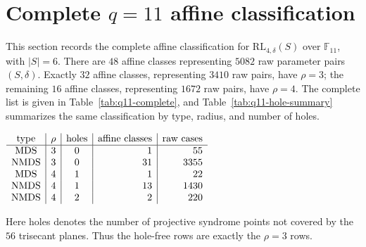 \documentclass[11pt]{article}
\newcommand{\F}{\mathbb F}
\newcommand{\RL}{\mathrm{RL}}
\theoremstyle{plain}
\theoremstyle{definition}
\begin{document}
\section{Complete \texorpdfstring{\(q=11\)}{q=11} affine classification}
\label{sec:q11-complete}

This section records the complete affine classification for
\(\RL_{4,\delta}(S)\) over \(\F_{11}\), with \(|S|=6\).  There are \(48\)
affine classes representing \(5082\) raw parameter pairs \((S,\delta)\).
Exactly \(32\) affine classes, representing \(3410\) raw pairs, have
\(\rho=3\); the remaining \(16\) affine classes, representing \(1672\) raw
pairs, have \(\rho=4\).  The complete list is given in
Table~\ref{tab:q11-complete}, and Table~\ref{tab:q11-hole-summary}
summarizes the same classification by type, radius, and number of holes.

\begin{center}
\label{tab:q11-hole-summary}
\(
\begin{array}{c|c|c|r|r}
\hbox{type} & \rho & \hbox{holes} & \hbox{affine classes} & \hbox{raw cases}\\
\hline
\mathrm{MDS}  & 3 & 0 & 1  & 55\\
\mathrm{NMDS} & 3 & 0 & 31 & 3355\\
\mathrm{MDS}  & 4 & 1 & 1  & 22\\
\mathrm{NMDS} & 4 & 1 & 13 & 1430\\
\mathrm{NMDS} & 4 & 2 & 2  & 220
\end{array}
\)
\end{center}

Here holes denotes the number of projective syndrome points not covered by
the \(56\) trisecant planes.  Thus the hole-free rows are exactly the
\(\rho=3\) rows.
\end{document}

